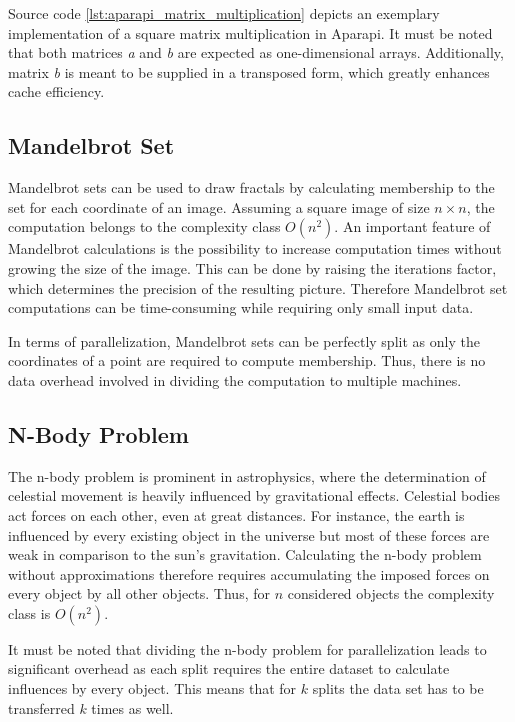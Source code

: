 Source code \ref{lst:aparapi_matrix_multiplication} depicts an exemplary implementation of a square matrix multiplication in Aparapi. It must be noted that both matrices \textit{a} and \textit{b} are expected as one-dimensional arrays. Additionally, matrix \textit{b} is meant to be supplied in a transposed form, which greatly enhances cache efficiency.

\subsection*{Mandelbrot Set}

Mandelbrot sets can be used to draw fractals by calculating membership to the set for each coordinate of an image\cite{mandelbrot_article}. Assuming a square image of size $n\times n$, the computation belongs to the complexity class $O(n^2)$. An important feature of Mandelbrot calculations is the possibility to increase computation times without growing the size of the image. This can be done by raising the iterations factor, which determines the precision of the resulting picture. Therefore Mandelbrot set computations can be time-consuming while requiring only small input data.

In terms of parallelization, Mandelbrot sets can be perfectly split as only the coordinates of a point are required to compute membership. Thus, there is no data overhead involved in dividing the computation to multiple machines.

\subsection*{N-Body Problem}

The n-body problem is prominent in astrophysics, where the determination of celestial movement is heavily influenced by gravitational effects\cite{nbody_article}. Celestial bodies act forces on each other, even at great distances. For instance, the earth is influenced by every existing object in the universe but most of these forces are weak in comparison to the sun's gravitation. Calculating the n-body problem without approximations therefore requires accumulating the imposed forces on every object by all other objects. Thus, for $n$ considered objects the complexity class is $O(n^2)$.

It must be noted that dividing the n-body problem for parallelization leads to significant overhead as each split requires the entire dataset to calculate influences by every object. This means that for $k$ splits the data set has to be transferred $k$ times as well.

